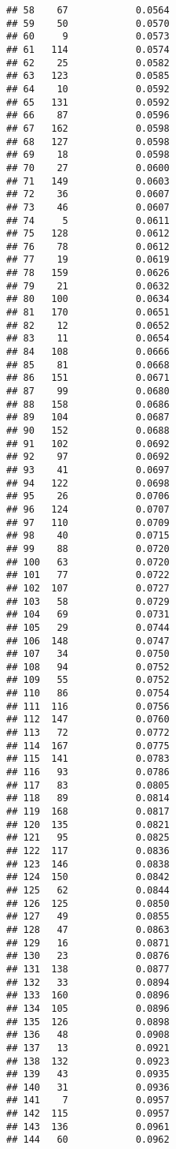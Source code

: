 \documentclass[
]{article}
\begin{document}
\begin{verbatim}
## 58    67            0.0564
## 59    50            0.0570
## 60     9            0.0573
## 61   114            0.0574
## 62    25            0.0582
## 63   123            0.0585
## 64    10            0.0592
## 65   131            0.0592
## 66    87            0.0596
## 67   162            0.0598
## 68   127            0.0598
## 69    18            0.0598
## 70    27            0.0600
## 71   149            0.0603
## 72    36            0.0607
## 73    46            0.0607
## 74     5            0.0611
## 75   128            0.0612
## 76    78            0.0612
## 77    19            0.0619
## 78   159            0.0626
## 79    21            0.0632
## 80   100            0.0634
## 81   170            0.0651
## 82    12            0.0652
## 83    11            0.0654
## 84   108            0.0666
## 85    81            0.0668
## 86   151            0.0671
## 87    99            0.0680
## 88   158            0.0686
## 89   104            0.0687
## 90   152            0.0688
## 91   102            0.0692
## 92    97            0.0692
## 93    41            0.0697
## 94   122            0.0698
## 95    26            0.0706
## 96   124            0.0707
## 97   110            0.0709
## 98    40            0.0715
## 99    88            0.0720
## 100   63            0.0720
## 101   77            0.0722
## 102  107            0.0727
## 103   58            0.0729
## 104   69            0.0731
## 105   29            0.0744
## 106  148            0.0747
## 107   34            0.0750
## 108   94            0.0752
## 109   55            0.0752
## 110   86            0.0754
## 111  116            0.0756
## 112  147            0.0760
## 113   72            0.0772
## 114  167            0.0775
## 115  141            0.0783
## 116   93            0.0786
## 117   83            0.0805
## 118   89            0.0814
## 119  168            0.0817
## 120  135            0.0821
## 121   95            0.0825
## 122  117            0.0836
## 123  146            0.0838
## 124  150            0.0842
## 125   62            0.0844
## 126  125            0.0850
## 127   49            0.0855
## 128   47            0.0863
## 129   16            0.0871
## 130   23            0.0876
## 131  138            0.0877
## 132   33            0.0894
## 133  160            0.0896
## 134  105            0.0896
## 135  126            0.0898
## 136   48            0.0908
## 137   13            0.0921
## 138  132            0.0923
## 139   43            0.0935
## 140   31            0.0936
## 141    7            0.0957
## 142  115            0.0957
## 143  136            0.0961
## 144   60            0.0962

\end{verbatim}
\end{document}
